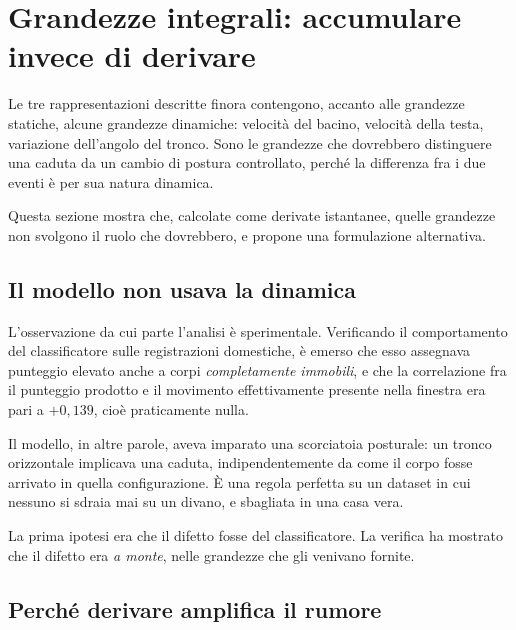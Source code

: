 
\section{Grandezze integrali: accumulare invece di derivare}
\label{sec:integrali}

Le tre rappresentazioni descritte finora contengono, accanto alle grandezze
statiche, alcune grandezze dinamiche: velocità del bacino, velocità della testa,
variazione dell'angolo del tronco. Sono le grandezze che dovrebbero distinguere
una caduta da un cambio di postura controllato, perché la differenza fra i due
eventi è per sua natura dinamica.

Questa sezione mostra che, calcolate come derivate istantanee, quelle grandezze
non svolgono il ruolo che dovrebbero, e propone una formulazione alternativa.

\subsection{Il modello non usava la dinamica}

L'osservazione da cui parte l'analisi è sperimentale. Verificando il
comportamento del classificatore sulle registrazioni domestiche, è emerso che
esso assegnava punteggio elevato anche a corpi \emph{completamente immobili}, e
che la correlazione fra il punteggio prodotto e il movimento effettivamente
presente nella finestra era pari a $+0{,}139$, cioè praticamente nulla.

Il modello, in altre parole, aveva imparato una scorciatoia posturale: un tronco
orizzontale implicava una caduta, indipendentemente da come il corpo fosse
arrivato in quella configurazione. È una regola perfetta su un dataset in cui
nessuno si sdraia mai su un divano, e sbagliata in una casa vera.

La prima ipotesi era che il difetto fosse del classificatore. La verifica ha
mostrato che il difetto era \emph{a monte}, nelle grandezze che gli venivano
fornite.

\subsection{Perché derivare amplifica il rumore}

